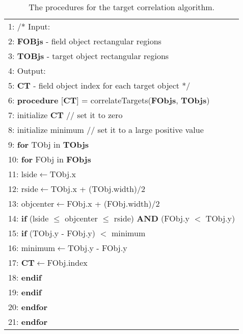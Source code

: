     \begin{table}
    \caption{The procedures for the target correlation algorithm.}
    \label{tab:targetcorrelation}
    \begin{center}
    \begin{tabular}{|l|}
    \hline
    1: /* Input:\\
    2: \hspace{2em}\textbf{FOBjs} - field object rectangular regions\\
    3: \hspace{2em}\textbf{TOBjs} - target object rectangular regions\\
    4: Output:\\
    5: \hspace{2em}\textbf{CT} - field object index for each target object */\\
    6: \textbf{procedure} [\textbf{CT}] = correlateTargets(\textbf{FObjs}, \textbf{TObjs})\\
    7: \hspace{.5em} initialize {\bf CT} // set it to zero\\
    8: \hspace{.5em} initialize minimum  // set it to a large positive value\\
    9: \hspace{.5em} \textbf{for} TObj in \textbf{TObjs}\\
    10: \hspace{1em} \textbf{for} FObj in \textbf{FObjs}\\
    11: \hspace{1.5em} lside$\gets$TObj.x\\
    12: \hspace{1.5em} rside$\gets$TObj.x + (TObj.width)/2\\
    13: \hspace{1.5em} objcenter$\gets$FObj.x + (FObj.width)/2\\
    14: \hspace{1.5em} \textbf{if} (lside $\leq$ objcenter $\leq$ rside) \textbf{AND} (FObj.y $<$ TObj.y)\\
    15: \hspace{2em} \textbf{if} (TObj.y - FObj.y) $<$ minimum\\
    16: \hspace{2.5em} minimum$\gets$TObj.y - FObj.y\\
    17: \hspace{2.5em} \textbf{CT}$\gets$FObj.index\\
    18: \hspace{2em} \textbf{endif}\\
    19: \hspace{1.5em} \textbf{endif}\\
    20: \hspace{1em} \textbf{endfor}\\
    21: \hspace{.5em} \textbf{endfor}\\
    \hline
    \end{tabular}
    \end{center}
    \end{table}

